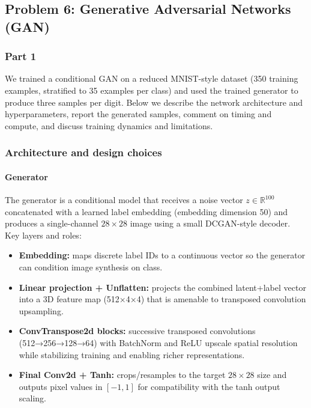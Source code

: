 \subsection{Problem 6: Generative Adversarial Networks (GAN)}

\subsubsection{Part 1}
We trained a conditional GAN on a reduced MNIST-style dataset (350 training examples, stratified to 35 examples per class) and used the trained generator to produce three samples per digit. Below we describe the network architecture and hyperparameters, report the generated samples, comment on timing and compute, and discuss training dynamics and limitations.

\subsubsection*{Architecture and design choices}
\paragraph{Generator}
The generator is a conditional model that receives a noise vector $z\in\mathbb{R}^{100}$ concatenated with a learned label embedding (embedding dimension 50) and produces a single-channel $28\times28$ image using a small DCGAN-style decoder. Key layers and roles:
\begin{itemize}
	\item \textbf{Embedding:} maps discrete label IDs to a continuous vector so the generator can condition image synthesis on class.
	\item \textbf{Linear projection + Unflatten:} projects the combined latent+label vector into a 3D feature map (512×4×4) that is amenable to transposed convolution upsampling.
	\item \textbf{ConvTranspose2d blocks:} successive transposed convolutions (512→256→128→64) with BatchNorm and ReLU upscale spatial resolution while stabilizing training and enabling richer representations.
	\item \textbf{Final Conv2d + Tanh:} crops/resamples to the target $28\times28$ size and outputs pixel values in $[-1,1]$ for compatibility with the tanh output scaling.
\end{itemize}

